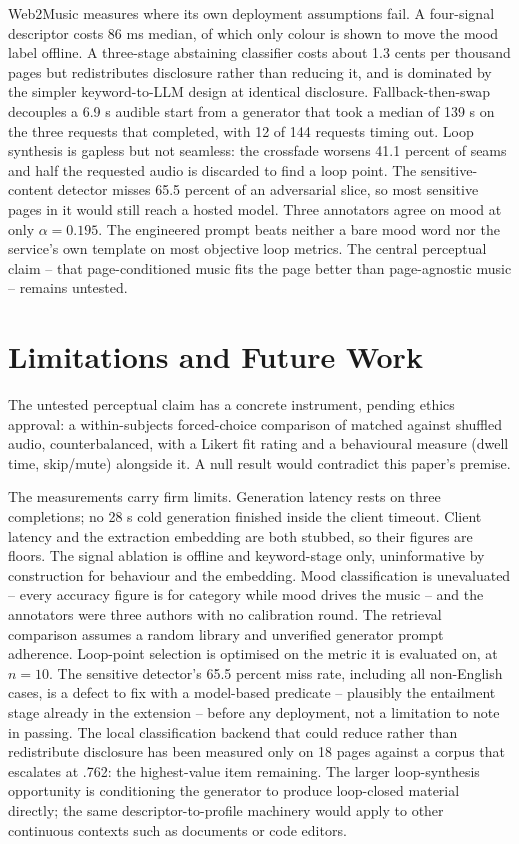 \documentclass[conference]{IEEEtran}
\begin{document}
Web2Music measures where its own deployment assumptions fail. A
four-signal descriptor costs 86 ms median, of which only colour is shown
to move the mood label offline. A three-stage abstaining classifier costs
about 1.3 cents per thousand pages but redistributes disclosure rather
than reducing it, and is dominated by the simpler keyword-to-LLM design
at identical disclosure. Fallback-then-swap decouples a 6.9 s audible
start from a generator that took a median of 139 s on the three requests
that completed, with 12 of 144 requests timing out. Loop synthesis is
gapless but not seamless: the crossfade worsens 41.1 percent of seams and
half the requested audio is discarded to find a loop point. The
sensitive-content detector misses 65.5 percent of an adversarial slice,
so most sensitive pages in it would still reach a hosted model. Three
annotators agree on mood at only $\alpha=0.195$. The engineered prompt
beats neither a bare mood word nor the service's own template on most
objective loop metrics. The central perceptual claim -- that
page-conditioned music fits the page better than page-agnostic music --
remains untested.

\section{Limitations and Future Work}
\label{sec:limitations}

The untested perceptual claim has a concrete instrument, pending ethics
approval: a within-subjects forced-choice comparison of matched against
shuffled audio, counterbalanced, with a Likert fit rating and a
behavioural measure (dwell time, skip/mute) alongside it. A null result
would contradict this paper's premise.

The measurements carry firm limits. Generation latency rests on three
completions; no 28 s cold generation finished inside the client timeout.
Client latency and the extraction embedding are both stubbed, so their
figures are floors. The signal ablation is offline and keyword-stage only,
uninformative by construction for behaviour and the embedding. Mood
classification is unevaluated -- every accuracy figure is for category
while mood drives the music -- and the annotators were three authors with
no calibration round. The retrieval comparison assumes a random library
and unverified generator prompt adherence. Loop-point selection is
optimised on the metric it is evaluated on, at $n=10$. The sensitive
detector's 65.5 percent miss rate, including all non-English cases, is a
defect to fix with a model-based predicate -- plausibly the entailment
stage already in the extension -- before any deployment, not a limitation
to note in passing. The local classification backend that could reduce
rather than redistribute disclosure has been measured only on 18 pages
against a corpus that escalates at .762: the highest-value item
remaining. The larger loop-synthesis opportunity is conditioning the
generator to produce loop-closed material directly; the same
descriptor-to-profile machinery would apply to other continuous contexts
such as documents or code editors.
\end{document}
